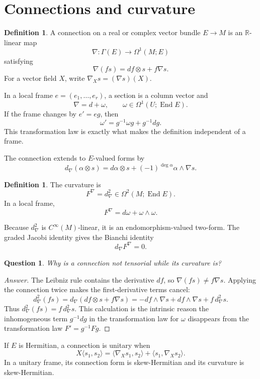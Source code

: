 \documentclass[11pt,oneside,reqno]{book}
\theoremstyle{plain}
\newtheorem{question}[theorem]{Question}
\theoremstyle{definition}
\newtheorem{definition}[theorem]{Definition}
\theoremstyle{remark}
\newenvironment{answer}{\begin{proof}[Answer]}{\end{proof}}
\begin{document}
\section{Connections and curvature}

\begin{definition}
A connection on a real or complex vector bundle \(E\to M\) is an
\(\mathbb R\)-linear map
\[
 \nabla:\Gamma(E)\longrightarrow\Omega^1(M;E)
\]
satisfying
\[
 \nabla(fs)=df\otimes s+f\nabla s.
\]
For a vector field \(X\), write \(\nabla_Xs=(\nabla s)(X)\).
\end{definition}

In a local frame \(e=(e_1,\ldots,e_r)\), a section is a column vector and
\[
 \nabla=d+\omega,\qquad
 \omega\in\Omega^1(U;\operatorname{End}E).
\]
If the frame changes by \(e'=eg\), then
\[
 \omega'=g^{-1}\omega g+g^{-1}dg.
\]
This transformation law is exactly what makes the definition independent
of a frame.

The connection extends to \(E\)-valued forms by
\[
 d_\nabla(\alpha\otimes s)
 =
 d\alpha\otimes s+(-1)^{\deg\alpha}\alpha\wedge\nabla s.
\]

\begin{definition}
The curvature is
\[
 F^\nabla=d_\nabla^2\in\Omega^2(M;\operatorname{End}E).
\]
In a local frame,
\[
 F^\nabla=d\omega+\omega\wedge\omega.
\]
\end{definition}

Because \(d_\nabla^2\) is \(C^\infty(M)\)-linear, it is an
endomorphism-valued two-form. The graded Jacobi identity gives the Bianchi
identity
\[
 d_\nabla F^\nabla=0.
\]

\begin{question}
Why is a connection not tensorial while its curvature is?
\end{question}

\begin{answer}
The Leibniz rule contains the derivative \(df\), so
\(\nabla(fs)\neq f\nabla s\). Applying the connection twice makes the
first-derivative terms cancel:
\[
 d_\nabla^2(fs)
 =d_\nabla(df\otimes s+f\nabla s)
 =-df\wedge\nabla s+df\wedge\nabla s+f\,d_\nabla^2s.
\]
Thus \(d_\nabla^2(fs)=f\,d_\nabla^2s\). This calculation is the intrinsic
reason the inhomogeneous term \(g^{-1}dg\) in the transformation law for
\(\omega\) disappears from the transformation law
\(F'=g^{-1}Fg\).
\end{answer}

If \(E\) is Hermitian, a connection is unitary when
\[
 X\langle s_1,s_2\rangle
 =
 \langle\nabla_Xs_1,s_2\rangle+\langle s_1,\nabla_Xs_2\rangle.
\]
In a unitary frame, its connection form is skew-Hermitian and its curvature
is skew-Hermitian.
\end{document}
